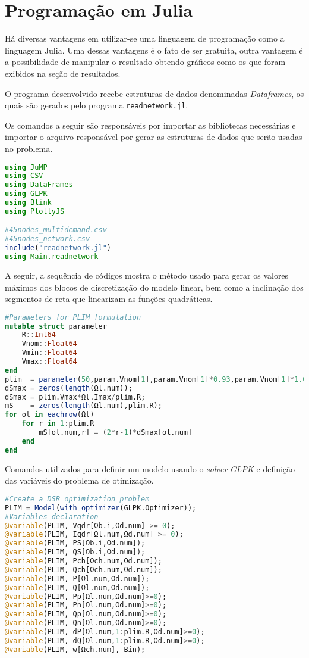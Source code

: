 \section{Programação em Julia}

Há diversas vantagens em utilizar-se uma linguagem de programação como a linguagem Julia.
Uma dessas vantagens é o fato de ser gratuita, outra vantagem é a possibilidade de manipular o resultado obtendo gráficos como os que foram exibidos na seção de resultados.

O programa desenvolvido recebe estruturas de dados denominadas \emph{Dataframes}, os quais são gerados pelo programa \verb|readnetwork.jl|.

Os comandos a seguir são responsáveis por importar as bibliotecas necessárias e importar o arquivo responsável por gerar as estruturas de dados que serão usadas no problema.

\begin{lstlisting}[language = Julia]
using JuMP
using CSV
using DataFrames
using GLPK
using Blink
using PlotlyJS

#45nodes_multidemand.csv
#45nodes_network.csv
include("readnetwork.jl")
using Main.readnetwork

\end{lstlisting}

A seguir, a sequência de códigos mostra  o método usado para gerar os valores máximos dos blocos de discretização do modelo linear, bem como a inclinação dos segmentos de reta que linearizam as funções quadráticas.

\begin{lstlisting}[language = Julia,firstnumber=12]
#Parameters for PLIM formulation
mutable struct parameter
    R::Int64
    Vnom::Float64
    Vmin::Float64
    Vmax::Float64
end
plim  = parameter(50,param.Vnom[1],param.Vnom[1]*0.93,param.Vnom[1]*1.05)
dSmax = zeros(length(Ωl.num));
dSmax = plim.Vmax*Ωl.Imax/plim.R;
mS    = zeros(length(Ωl.num),plim.R);
for ol in eachrow(Ωl)
    for r in 1:plim.R
        mS[ol.num,r] = (2*r-1)*dSmax[ol.num]
    end
end
\end{lstlisting}

Comandos utilizados para definir um modelo usando o \emph{solver} \emph{GLPK} e definição das variáveis do problema de otimização.

\begin{lstlisting}[language = Julia, firstnumber = 28]
#Create a DSR optimization problem
PLIM = Model(with_optimizer(GLPK.Optimizer));
#Variables declaration
@variable(PLIM, Vqdr[Ωb.i,Ωd.num] >= 0);
@variable(PLIM, Iqdr[Ωl.num,Ωd.num] >= 0);
@variable(PLIM, PS[Ωb.i,Ωd.num]);
@variable(PLIM, QS[Ωb.i,Ωd.num]);
@variable(PLIM, Pch[Ωch.num,Ωd.num]);
@variable(PLIM, Qch[Ωch.num,Ωd.num]);
@variable(PLIM, P[Ωl.num,Ωd.num]);
@variable(PLIM, Q[Ωl.num,Ωd.num]);
@variable(PLIM, Pp[Ωl.num,Ωd.num]>=0);
@variable(PLIM, Pn[Ωl.num,Ωd.num]>=0);
@variable(PLIM, Qp[Ωl.num,Ωd.num]>=0);
@variable(PLIM, Qn[Ωl.num,Ωd.num]>=0);
@variable(PLIM, dP[Ωl.num,1:plim.R,Ωd.num]>=0);
@variable(PLIM, dQ[Ωl.num,1:plim.R,Ωd.num]>=0);
@variable(PLIM, w[Ωch.num], Bin);
\end{lstlisting}

